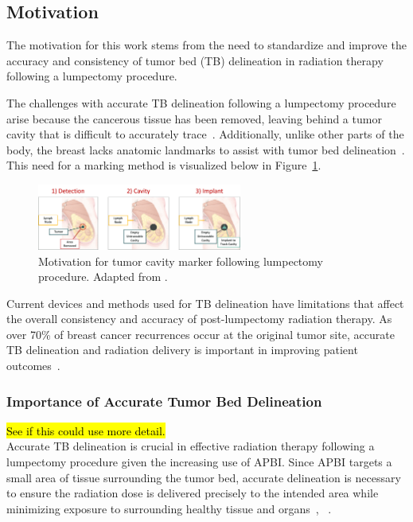 \subsection{Motivation\label{sec:introduction:motivation}}
The motivation for this work stems from the need to standardize and improve the accuracy and consistency of tumor bed (TB) delineation in radiation therapy following a lumpectomy procedure.

The challenges with accurate TB delineation following a lumpectomy procedure arise because the cancerous tissue has been removed, leaving behind a tumor cavity that is difficult to accurately trace~\cite{RefWorks:RefID:25-acree2022review}. Additionally, unlike other parts of the body, the breast lacks anatomic landmarks to assist with tumor bed delineation~\cite{RefWorks:RefID:344-mitchell2019adaptable}. This need for a marking method is visualized below in Figure~\ref{fig:introduction:need_for_tumor_bed_marker}.

\begin{figure}[h!]
        \centering
        \includegraphics[width=0.6\textwidth]{../figs/introduction/need_for_tumor_bed_marker.png}
        \caption{Motivation for tumor cavity marker following lumpectomy procedure. Adapted from \cite{RefWorks:RefID:38-johnbreastconserving}.}
        \label{fig:introduction:need_for_tumor_bed_marker}
\end{figure}

Current devices and methods used for TB delineation have limitations that affect the overall consistency and accuracy of post-lumpectomy radiation therapy. As over 70\% of breast cancer recurrences occur at the original tumor site, accurate TB delineation and radiation delivery is important in improving patient outcomes~\cite{RefWorks:RefID:25-acree2022review}.

\subsubsection{Importance of Accurate Tumor Bed Delineation\label{sec:introduction:motivation:importanceofaccuratetumorbeddelineation}}
\hl{See if this could use more detail.\\}
Accurate TB delineation is crucial in effective radiation therapy following a lumpectomy procedure given the increasing use of APBI. Since APBI targets a small area of tissue surrounding the tumor bed, accurate delineation is necessary to ensure the radiation dose is delivered precisely to the intended area while minimizing exposure to surrounding healthy tissue and organs~\cite{RefWorks:RefID:197-den2015postlumpectomy}, ~\cite{RefWorks:RefID:25-acree2022review}.

